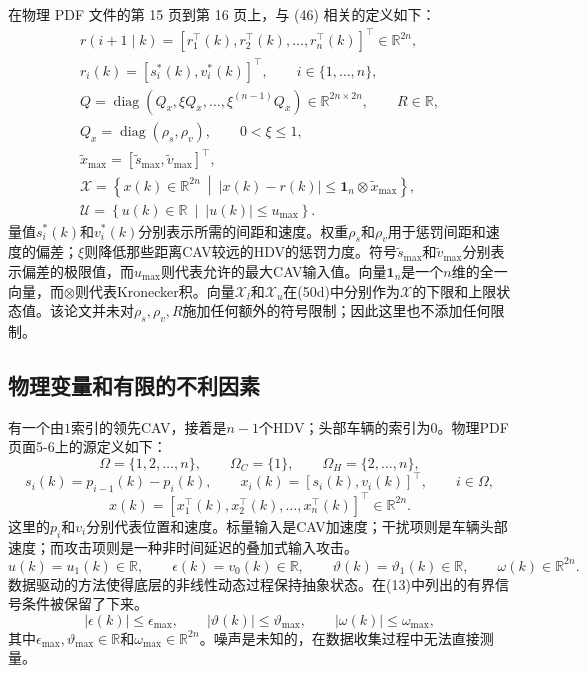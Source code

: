 \documentclass{article}
\begin{document}
在物理 PDF 文件的第 15 页到第 16 页上，与 (46) 相关的定义如下：
\[
\begin{gathered}
r(i+1\mid k)=\left[r_1^\top(k),r_2^\top(k),\ldots,r_n^\top(k)\right]^\top\in\mathbb{R}^{2n},\\
r_i(k)=\left[s_i^*(k),v_i^*(k)\right]^\top,\qquad i\in\{1,\ldots,n\},\\
Q=\operatorname{diag}\left(Q_x,\xi Q_x,\ldots,\xi^{(n-1)}Q_x\right)\in\mathbb{R}^{2n\times2n},\qquad R\in\mathbb{R},\\
Q_x=\operatorname{diag}(\rho_s,\rho_v),\qquad 0<\xi\leq1,\\
\tilde{x}_{\max}=[\tilde{s}_{\max},\tilde{v}_{\max}]^\top,\\
\mathcal{X}=\left\{x(k)\in\mathbb{R}^{2n}\ \middle|\ |x(k)-r(k)|\leq\mathbf{1}_n\otimes\tilde{x}_{\max}\right\},\\
\mathcal{U}=\left\{u(k)\in\mathbb{R}\ \middle|\ |u(k)|\leq u_{\max}\right\}.
\end{gathered}
\]
量值$s_i^*(k)$和$v_i^*(k)$分别表示所需的间距和速度。权重$\rho_s$和$\rho_v$用于惩罚间距和速度的偏差；$\xi$则降低那些距离CAV较远的HDV的惩罚力度。符号$\tilde{s}_{\max}$和$\tilde{v}_{\max}$分别表示偏差的极限值，而$u_{\max}$则代表允许的最大CAV输入值。向量$\mathbf{1}_n$是一个$n$维的全一向量，而$\otimes$则代表Kronecker积。向量$\mathcal{X}_l$和$\mathcal{X}_u$在(50d)中分别作为$\mathcal{X}$的下限和上限状态值。该论文并未对$\rho_s,\rho_v,R$施加任何额外的符号限制；因此这里也不添加任何限制。

\subsection*{物理变量和有限的不利因素}
有一个由$1$索引的领先CAV，接着是$n-1$个HDV；头部车辆的索引为$0$。物理PDF页面5-6上的源定义如下：
\[
\Omega=\{1,2,\ldots,n\},\qquad \Omega_C=\{1\},\qquad \Omega_H=\{2,\ldots,n\},
\]
\[
s_i(k)=p_{i-1}(k)-p_i(k),\qquad x_i(k)=[s_i(k),v_i(k)]^\top,\qquad i\in\Omega,
\]
\begin{equation}
x(k)=\left[x_1^\top(k),x_2^\top(k),\ldots,x_n^\top(k)\right]^\top\in\mathbb{R}^{2n}. \tag{11}
\end{equation}
这里的$p_i$和$v_i$分别代表位置和速度。标量输入是CAV加速度；干扰项则是车辆头部速度；而攻击项则是一种非时间延迟的叠加式输入攻击。
\[
u(k)=u_1(k)\in\mathbb{R},\qquad \epsilon(k)=v_0(k)\in\mathbb{R},\qquad \vartheta(k)=\vartheta_1(k)\in\mathbb{R},\qquad \omega(k)\in\mathbb{R}^{2n}.
\]
数据驱动的方法使得底层的非线性动态过程保持抽象状态。在(13)中列出的有界信号条件被保留了下来。
\begin{equation}
|\epsilon(k)|\leq\epsilon_{\max},\qquad |\vartheta(k)|\leq\vartheta_{\max},\qquad |\omega(k)|\leq\omega_{\max}, \tag{13}
\end{equation}
其中$\epsilon_{\max},\vartheta_{\max}\in\mathbb{R}$和$\omega_{\max}\in\mathbb{R}^{2n}$。噪声是未知的，在数据收集过程中无法直接测量。
\end{document}
